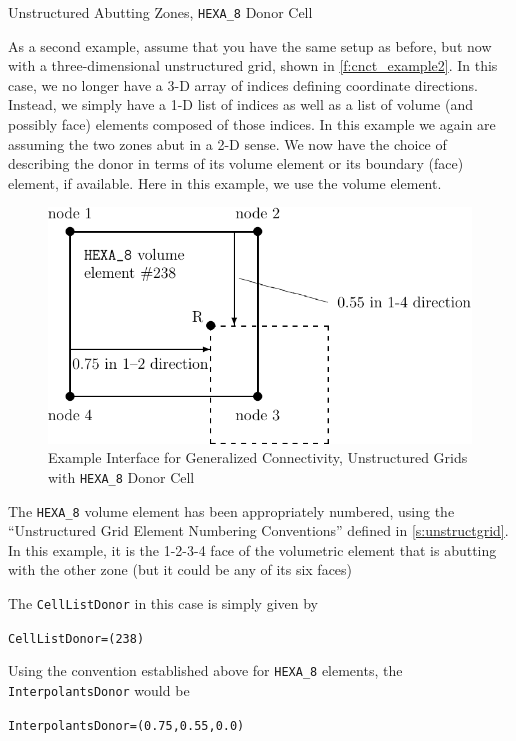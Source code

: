 \begin{example}{Unstructured Abutting Zones, \texttt{HEXA\_8} Donor Cell}
\label{ex:unstruct_abut1}

As a second example, assume that you have the same setup as before, but
now with a three-dimensional unstructured grid, shown in
\autoref{f:cnct_example2}.
In this case, we no longer have a 3-D array of indices defining
coordinate directions.
Instead, we simply have a 1-D list of indices as well as a list of
volume (and possibly face) elements composed of those indices.
In this example we again are assuming the two zones abut in a 2-D sense.
We now have the choice of describing the donor in terms of its volume
element or its boundary (face) element, if available.
Here in this example, we use the volume element.

\begin{figure}[!htb]
   \centering
   \includegraphics{cnct.figs/cnct_example2}
   \caption{Example Interface for Generalized Connectivity, Unstructured
            Grids with \texttt{HEXA\_8} Donor Cell}
   \label{f:cnct_example2}
\end{figure}

The \texttt{HEXA\_8} volume element has been appropriately numbered,
using the ``Unstructured Grid Element Numbering Conventions'' defined in
\autoref{s:unstructgrid}.
In this example, it is the 1-2-3-4 face of the volumetric element that
is abutting with the other zone (but it could be any of its six faces)

The \texttt{CellListDonor} in this case is simply given by
\begin{alltt}
   CellListDonor = (238)
\end{alltt}
Using the convention established above for \texttt{HEXA\_8} elements, the
\texttt{InterpolantsDonor} would be
\begin{alltt}
   InterpolantsDonor = (0.75, 0.55, 0.0)
\end{alltt}
\end{example}

